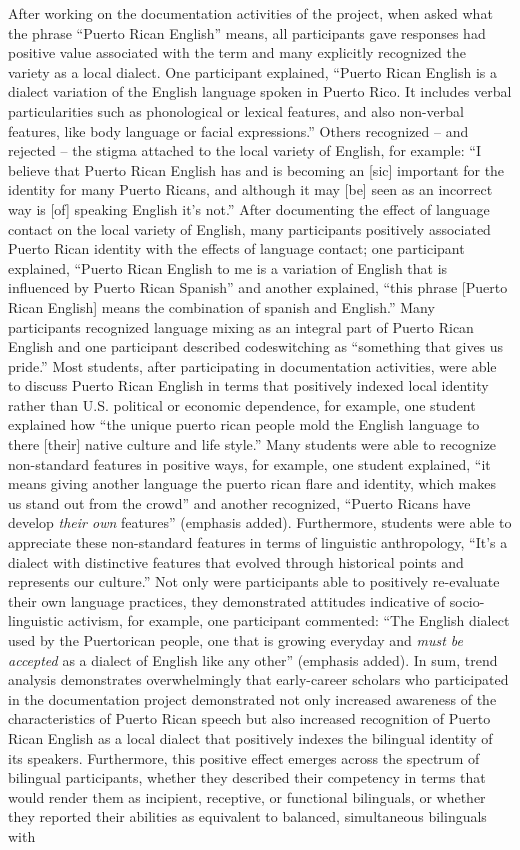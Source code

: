 \documentclass[output=paper,colorlinks,citecolor=brown]{langscibook}
\begin{document}
After working on the documentation activities of the project, when asked what the phrase “Puerto Rican English” means, all participants gave responses had positive value associated with the term and many explicitly recognized the variety as a local dialect. One participant explained, “Puerto Rican English is a dialect variation of the English language spoken in Puerto Rico. It includes verbal particularities such as phonological or lexical features, and also non-verbal features, like body language or facial expressions.” Others recognized -- and rejected -- the stigma attached to the local variety of English, for example: “I believe that Puerto Rican English has and is becoming an [sic] important for the identity for many Puerto Ricans, and although it may [be] seen as an incorrect way is [of] speaking English it's not.” After documenting the effect of language contact on the local variety of English, many participants positively associated Puerto Rican identity with the effects of language contact; one participant explained, “Puerto Rican English to me is a variation of English that is influenced by Puerto Rican Spanish” and another explained, “this phrase [Puerto Rican English] means the combination of spanish and English.” Many participants recognized language mixing as an integral part of Puerto Rican English and one participant described codeswitching as “something that gives us pride.” Most students, after participating in documentation activities, were able to discuss Puerto Rican English in terms that positively indexed local identity rather than U.S. political or economic dependence, for example, one student explained how “the unique puerto rican people mold the English language to there [their] native culture and life style.” Many students were able to recognize non-standard features in positive ways, for example, one student explained, “it means giving another language the puerto rican flare and identity, which makes us stand out from the crowd” and another recognized, “Puerto Ricans have develop \emph{their own} features” (emphasis added). Furthermore, students were able to appreciate these non-standard features in terms of linguistic anthropology, “It's a dialect with distinctive features that evolved through historical points and represents our culture.” Not only were participants able to positively re-evaluate their own language practices, they demonstrated attitudes indicative of socio-linguistic activism, for example, one participant commented: “The English dialect used by the Puertorican people, one that is growing everyday and \emph{must be accepted} as a dialect of English like any other” (emphasis added). In sum, trend analysis demonstrates overwhelmingly that early-career scholars who participated in the documentation project demonstrated not only increased awareness of the characteristics of Puerto Rican speech but also increased recognition of Puerto Rican English as a local dialect that positively indexes the bilingual identity of its speakers. Furthermore, this positive effect emerges across the spectrum of bilingual participants, whether they described their competency in terms that would render them as incipient, receptive, or functional bilinguals, or whether they reported their abilities as equivalent to balanced, simultaneous bilinguals with 
\end{document}
